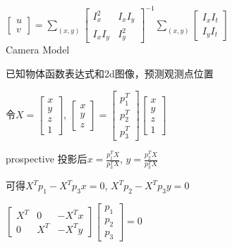 \documentclass[UTF8]{ctexart}
\begin{document}
  \quad \quad \quad $
    \begin{bmatrix}
      u \\
      v
      \end{bmatrix}
    = 
    \sum_{(x, y)}
    \begin{bmatrix}
      I_x^2 & I_xI_y \\
      I_xI_y & I_y^2
      \end{bmatrix}^{-1}
    \sum_{(x, y)}
    \begin{bmatrix}
      I_xI_t \\
      I_yI_t
      \end{bmatrix}$\\
Camera Model 

  已知物体函数表达式和2d图像，预测观测点位置

  令$X = 
    \begin{bmatrix}
      x \\
      y \\
      z \\
      1
      \end{bmatrix}$, $
    \begin{bmatrix}
      x \\
      y \\
      z
      \end{bmatrix} 
    =
    \begin{bmatrix}
      p_1^T \\
      p_2^T \\
      p_3^T
      \end{bmatrix}
    \begin{bmatrix}
      x \\
      y \\
      z \\
      1
      \end{bmatrix}$

  prospective 投影后$x = \frac{p_1^TX}{p_3^TX}$, $y = \frac{p_2^TX}{p_3^TX}$

  \quad 可得$X^Tp_1 - X^Tp_3x = 0$, $X^Tp_2 - X^Tp_3y = 0$

  \quad $
    \begin{bmatrix}
      X^T & 0 & -X^Tx \\
      0 & X^T & -X^Ty
      \end{bmatrix}
    \begin{bmatrix}
      p_1 \\
      p_2 \\
      p_3
      \end{bmatrix}
    = 0$
\end{document}
